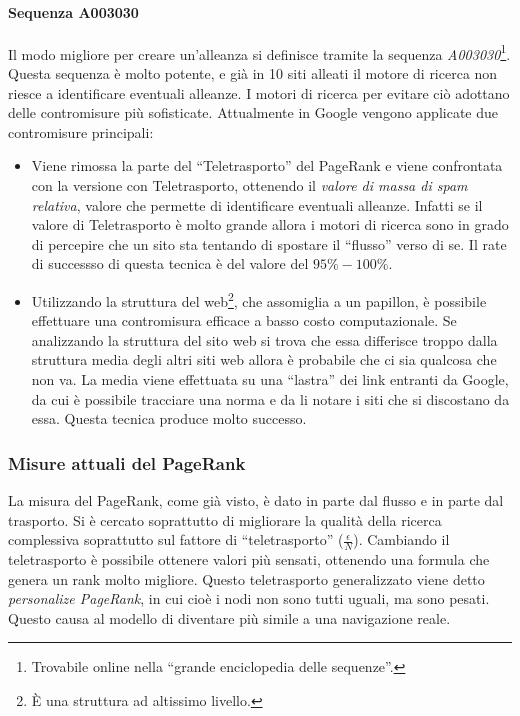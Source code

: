 \paragraph*{Sequenza A003030}Il modo migliore per creare un'alleanza si definisce tramite la sequenza \textit{A003030}\footnote{Trovabile online nella ``grande enciclopedia delle sequenze''.}. Questa sequenza \`e molto potente, e gi\`a in 10 siti alleati il motore di ricerca non riesce a identificare eventuali alleanze. I motori di ricerca per evitare ci\`o adottano delle contromisure pi\`u sofisticate. Attualmente in Google vengono applicate due contromisure principali:
\begin{itemize}

\item Viene rimossa la parte del ``Teletrasporto'' del PageRank e viene confrontata con la versione con Teletrasporto, ottenendo il \textit{valore di massa di spam relativa}, valore che permette di identificare eventuali alleanze. Infatti se il valore di Teletrasporto \`e molto grande allora i motori di ricerca sono in grado di percepire che un sito sta tentando di spostare il ``flusso'' verso di se. Il rate di successso di questa tecnica \`e del valore del $95\%-100\%$.

\item Utilizzando la struttura del web\footnote{\`E una struttura ad altissimo livello.}, che assomiglia a un papillon, \`e possibile effettuare una contromisura efficace a basso costo computazionale. Se analizzando la struttura del sito web si trova che essa differisce troppo dalla struttura media degli altri siti web allora \`e probabile che ci sia qualcosa che non va. La media viene effettuata su una ``lastra'' dei link entranti da Google, da cui \`e possibile tracciare una norma e da li notare i siti che si discostano da essa. Questa tecnica produce molto successo.

\end{itemize}

\subsubsection{Misure attuali del PageRank}
La misura del PageRank, come gi\`a visto, \`e dato in parte dal flusso e in parte dal trasporto. Si \`e cercato soprattutto di migliorare la qualit\`a della ricerca complessiva soprattutto sul fattore di ``teletrasporto'' ($\frac{\epsilon}{N}$).
Cambiando il teletrasporto \`e possibile ottenere valori pi\`u sensati, ottenendo una formula che genera un rank molto migliore. Questo teletrasporto generalizzato viene detto \textit{personalize PageRank}, in cui cio\`e i nodi non sono tutti uguali, ma sono pesati. Questo causa al modello di diventare pi\`u simile a una navigazione reale.

